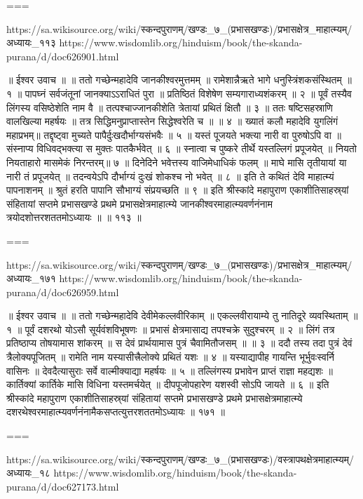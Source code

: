 ===

https://sa.wikisource.org/wiki/स्कन्दपुराणम्/खण्डः_७_(प्रभासखण्डः)/प्रभासक्षेत्र_माहात्म्यम्/अध्यायः_११३
https://www.wisdomlib.org/hinduism/book/the-skanda-purana/d/doc626901.html

॥ ईश्वर उवाच ॥ ॥
ततो गच्छेन्महादेवि जानकीश्वरमुत्तमम् ॥
रामेशान्नैऋते भागे धनुस्त्रिंशकसंस्थितम् ॥ १ ॥
पापघ्नं सर्वजंतूनां जानक्याऽऽराधितं पुरा ॥
प्रतिष्ठितं विशेषेण सम्यगाराध्यशंकरम् ॥ २ ॥
पूर्वं तस्यैव लिंगस्य वसिष्ठेशेति नाम वै ॥
तत्पश्चाज्जानकीशेति त्रेतायां प्रथितं क्षितौ ॥ ३ ॥
ततः षष्टिसहस्राणि वालखिल्या महर्षयः ॥
तत्र सिद्धिमनुप्राप्तास्तेन सिद्धेश्वरेति च ॥ ॥ ४ ॥
ख्यातं कलौ महादेवि युगलिंगं महाप्रभम्॥
तद्दृष्ट्वा मुच्यते पापैर्दुःखदौर्भाग्यसंभवैः ॥ ५ ॥
यस्तं पूजयते भक्त्या नारी वा पुरुषोऽपि वा ॥
संस्नाप्य विधिवद्भक्त्या स मुक्तः पातकैर्भवेत् ॥ ६ ॥
स्नात्वा च पुष्करे तीर्थे यस्तल्लिगं प्रपूजयेत् ॥
नियतो नियताहारो मासमेकं निरन्तरम्॥ ७ ॥
दिनेदिने भवेत्तस्य वाजिमेधाधिकं फलम् ॥
माघे मासि तृतीयायां या नारी तं प्रपूजयेत् ॥
तदन्वयेऽपि दौर्भाग्यं दुःखं शोकश्च नो भवेत् ॥ ८ ॥
इति ते कथितं देवि माहात्म्यं पापनाशनम् ॥
श्रुतं हरति पापानि सौभाग्यं संप्रयच्छति ॥ ९ ॥
इति श्रीस्कांदे महापुराण एकाशीतिसाहस्र्यां संहितायां सप्तमे प्रभासखण्डे प्रथमे प्रभासक्षेत्रमाहात्म्ये जानकीश्वरमाहात्म्यवर्णनंनाम त्रयोदशोत्तरशततमोऽध्यायः ॥ ॥ ११३ ॥

===

https://sa.wikisource.org/wiki/स्कन्दपुराणम्/खण्डः_७_(प्रभासखण्डः)/प्रभासक्षेत्र_माहात्म्यम्/अध्यायः_१७१
https://www.wisdomlib.org/hinduism/book/the-skanda-purana/d/doc626959.html

॥ ईश्वर उवाच ॥ ॥
ततो गच्छेन्महादेवि देवीमेकल्लवीरिकाम् ॥
एकल्लवीरायाम्ये तु नातिदूरे व्यवस्थिताम् ॥ १ ॥
पूर्वं दशरथो योऽसौ सूर्यवंशविभूषणः ॥
प्रभासं क्षेत्रमासाद्य तपश्चक्रे सुदुश्चरम् ॥ २ ॥
लिंगं तत्र प्रतिष्ठाप्य तोषयामास शांकरम् ॥
स देवं प्रार्थयामास पुत्रं चैवामितौजसम् ॥ ॥ ३ ॥
ददौ तस्य तदा पुत्रं देवं त्रैलोक्यपूजितम् ॥
रामेति नाम यस्यासीत्त्रैलोक्ये प्रथितं यशः ॥ ४ ॥
यस्याद्यापीह गायन्ति भूर्भुवःस्वर्नि वासिनः ॥
देवदैत्यासुराः सर्वे वाल्मीक्याद्या महर्षयः ॥ ५ ॥
तल्लिंगस्य प्रभावेन प्राप्तं राज्ञा महद्यशः ॥
कार्तिक्यां कार्तिके मासि विधिना यस्तमर्चयेत् ॥
दीपपूजोपहारेण यशस्वी सोऽपि जायते ॥ ६ ॥
इति श्रीस्कांदे महापुराण एकाशीतिसाहस्र्यां संहितायां सप्तमे प्रभासखण्डे प्रथमे प्रभासक्षेत्रमाहात्म्ये दशरथेश्वरमाहात्म्यवर्णनंनामैकसप्तत्युत्तरशततमोऽध्यायः ॥ १७१ ॥

===

https://sa.wikisource.org/wiki/स्कन्दपुराणम्/खण्डः_७_(प्रभासखण्डः)/वस्त्रापथक्षेत्रमाहात्म्यम्/अध्यायः_१८
https://www.wisdomlib.org/hinduism/book/the-skanda-purana/d/doc627173.html

